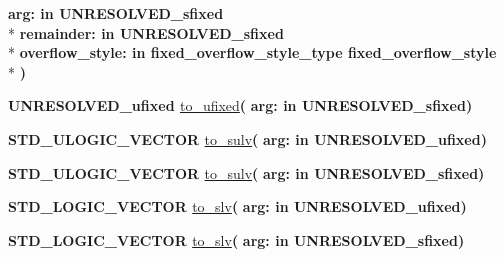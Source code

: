 \begin{DoxyCompactItemize}
{\bfseries \textcolor{vhdlchar}{arg\+: }\textcolor{stringliteral}{in }\textcolor{vhdlchar}{U\+N\+R\+E\+S\+O\+L\+V\+E\+D\+\_\+sfixed}}\\*
{\bfseries \textcolor{vhdlchar}{remainder\+: }\textcolor{stringliteral}{in }\textcolor{vhdlchar}{U\+N\+R\+E\+S\+O\+L\+V\+E\+D\+\_\+sfixed}}\\*
{\bfseries \textcolor{vhdlchar}{overflow\+\_\+style\+: }\textcolor{stringliteral}{in }\textcolor{vhdlchar}{fixed\+\_\+overflow\+\_\+style\+\_\+type     fixed\+\_\+overflow\+\_\+style}}\\*
{\bfseries  )} 
\item 
{\bfseries {\bfseries \textcolor{vhdlchar}{U\+N\+R\+E\+S\+O\+L\+V\+E\+D\+\_\+ufixed}\textcolor{vhdlchar}{ }}} \hyperlink{class__fixed__pkg_a0540df42999977255e75bf7015888193}{to\+\_\+ufixed}{\bfseries  ( }{\bfseries \textcolor{vhdlchar}{arg\+: }\textcolor{stringliteral}{in }\textcolor{vhdlchar}{U\+N\+R\+E\+S\+O\+L\+V\+E\+D\+\_\+sfixed}}{\bfseries  )} 
\item 
{\bfseries {\bfseries \textcolor{comment}{S\+T\+D\+\_\+\+U\+L\+O\+G\+I\+C\+\_\+\+V\+E\+C\+T\+O\+R}\textcolor{vhdlchar}{ }}} \hyperlink{class__fixed__pkg_ae65ded74d90d1447219aadde498413f6}{to\+\_\+sulv}{\bfseries  ( }{\bfseries \textcolor{vhdlchar}{arg\+: }\textcolor{stringliteral}{in }\textcolor{vhdlchar}{U\+N\+R\+E\+S\+O\+L\+V\+E\+D\+\_\+ufixed}}{\bfseries  )} 
\item 
{\bfseries {\bfseries \textcolor{comment}{S\+T\+D\+\_\+\+U\+L\+O\+G\+I\+C\+\_\+\+V\+E\+C\+T\+O\+R}\textcolor{vhdlchar}{ }}} \hyperlink{class__fixed__pkg_ae65ded74d90d1447219aadde498413f6}{to\+\_\+sulv}{\bfseries  ( }{\bfseries \textcolor{vhdlchar}{arg\+: }\textcolor{stringliteral}{in }\textcolor{vhdlchar}{U\+N\+R\+E\+S\+O\+L\+V\+E\+D\+\_\+sfixed}}{\bfseries  )} 
\item 
{\bfseries {\bfseries \textcolor{comment}{S\+T\+D\+\_\+\+L\+O\+G\+I\+C\+\_\+\+V\+E\+C\+T\+O\+R}\textcolor{vhdlchar}{ }}} \hyperlink{class__fixed__pkg_a9c3180a00dbf88210834703d4f0e4a18}{to\+\_\+slv}{\bfseries  ( }{\bfseries \textcolor{vhdlchar}{arg\+: }\textcolor{stringliteral}{in }\textcolor{vhdlchar}{U\+N\+R\+E\+S\+O\+L\+V\+E\+D\+\_\+ufixed}}{\bfseries  )} 
\item 
{\bfseries {\bfseries \textcolor{comment}{S\+T\+D\+\_\+\+L\+O\+G\+I\+C\+\_\+\+V\+E\+C\+T\+O\+R}\textcolor{vhdlchar}{ }}} \hyperlink{class__fixed__pkg_a9c3180a00dbf88210834703d4f0e4a18}{to\+\_\+slv}{\bfseries  ( }{\bfseries \textcolor{vhdlchar}{arg\+: }\textcolor{stringliteral}{in }\textcolor{vhdlchar}{U\+N\+R\+E\+S\+O\+L\+V\+E\+D\+\_\+sfixed}}{\bfseries  )} 

\end{DoxyCompactItemize}
